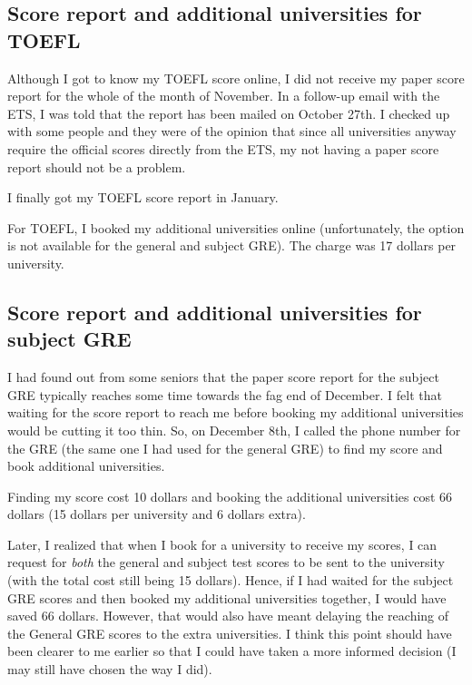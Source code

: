 \documentclass[a4paper]{amsart}
\begin{document}
\subsection{Score report and additional universities for TOEFL}

Although I got to know my TOEFL score online, I did not receive my
paper score report for the whole of the month of November. In a follow-up
email with the ETS, I was told that the report has been mailed
on October 27th. I checked up with some people  and they were
of the opinion that since all universities anyway require the official scores
directly from the ETS, my not having a paper score report should not
be a problem.

I finally got my TOEFL score report in January.

For TOEFL, I booked my additional universities online (unfortunately,
the option is not available for the general and subject GRE). The charge
was 17 dollars per university.

\subsection{Score report and additional universities for subject GRE}

I had found out from some seniors that the paper score report for the
subject GRE typically reaches some time towards the fag end of
December. I felt that waiting for the score report to reach me before
booking my additional universities would be cutting it too thin. So, on
December 8th, I called the phone number for the GRE (the same one I
had used for the general GRE) to find my score and book additional
universities.

Finding my score cost 10 dollars and booking the additional universities
cost 66 dollars (15 dollars per university and 6 dollars extra).

Later, I realized that when I book for a university to receive my
scores, I can request for {\em both} the general and subject test
scores to be sent to the university (with the total cost still being
15 dollars). Hence, if I had waited for the subject GRE scores and
then booked my additional universities together, I would have saved 66
dollars. However, that would also have meant delaying the reaching of
the General GRE scores to the extra universities. I think this point
should have been clearer to me earlier so that I could have taken a
more informed decision (I may still have chosen the way I did).
\end{document}
